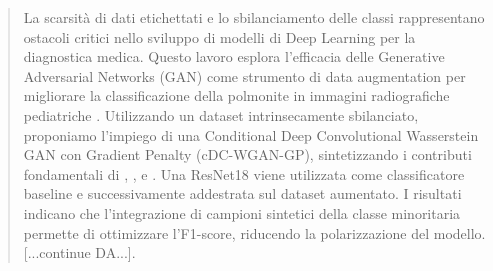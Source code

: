 \begin{abstract}
La scarsità di dati etichettati e lo sbilanciamento delle classi rappresentano ostacoli critici nello sviluppo di modelli di Deep Learning per la diagnostica medica. Questo lavoro esplora l'efficacia delle Generative Adversarial Networks (GAN) come strumento di data augmentation per migliorare la classificazione della polmonite in immagini radiografiche pediatriche \cite{kermany2018identifying}. Utilizzando un dataset intrinsecamente sbilanciato, proponiamo l’impiego di una Conditional Deep Convolutional Wasserstein GAN con Gradient Penalty (cDC-WGAN-GP), sintetizzando i contributi fondamentali di \cite{mirza2014conditionalgenerativeadversarialnets}, \cite{radford2015unsupervised}, \cite{arjovsky2017wasserstein} e \cite{gulrajani2017improved}. Una ResNet18 \cite{He_2016_CVPR} viene utilizzata come classificatore baseline e successivamente addestrata sul dataset aumentato. I risultati indicano che l'integrazione di campioni sintetici della classe minoritaria permette di ottimizzare l'F1-score, riducendo la polarizzazione del modello. [...continue DA...].
\end{abstract}